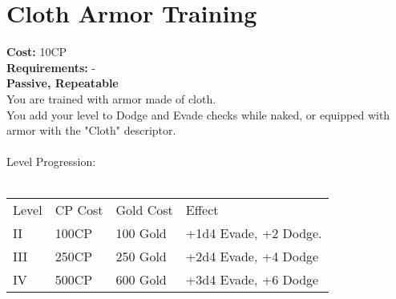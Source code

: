 \section{Cloth Armor Training}\label{perk:clothArmorTraining}
\textbf{Cost:} 10CP\\
\textbf{Requirements:} -\\
\textbf{Passive, Repeatable}\\
You are trained with armor made of cloth.\\
You add your level to Dodge and Evade checks while naked, or equipped with armor with the "Cloth" descriptor.\\
\\

Level Progression:\\
\\
\begin{tabular}{l | l | l | l}
	Level & CP Cost & Gold Cost & Effect\\
	II & 100CP & 100 Gold & +1d4 Evade, +2 Dodge.\\
	III & 250CP & 250 Gold & +2d4 Evade, +4 Dodge\\
	IV & 500CP & 600 Gold & +3d4 Evade, +6 Dodge\\
\end{tabular}